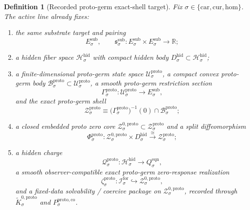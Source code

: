 \documentclass[11pt]{article}
\newcommand{\Car}{\mathrm{car}}
\newcommand{\Cur}{\mathrm{cur}}
\newcommand{\Hom}{\mathrm{hom}}
\newcommand{\ForSpace}[1]{\mathcal I_{#1}^{\mathrm{for}}}
\newcommand{\SubTarget}[1]{E_{#1}^{\mathrm{sub}}}
\newcommand{\SubPair}[1]{\mathfrak s_{#1}^{\mathrm{sub}}}
\newcommand{\EqnTarget}[1]{Q_{#1}^{\mathrm{eqn}}}
\newcommand{\HiddenSpace}[1]{\mathcal H_{#1}^{\mathrm{hid}}}
\newcommand{\HiddenBody}[1]{D_{#1}^{\mathrm{hid}}}
\newcommand{\ProtoSpace}[1]{\mathcal U_{#1}^{\mathrm{proto}}}
\newcommand{\ProtoBody}[1]{\mathcal B_{#1}^{\mathrm{proto}}}
\newcommand{\ProtoSection}[1]{\Gamma_{#1}^{\mathrm{proto}}}
\newcommand{\ProtoShellSet}[1]{\mathcal Z_{#1}^{\mathrm{proto}}}
\newcommand{\ProtoZeroCore}[1]{\mathcal Z_{#1}^{0,\mathrm{proto}}}
\newcommand{\ProtoSplit}[1]{\Phi_{#1}^{\mathrm{proto}}}
\newcommand{\ProtoCharge}[1]{\mathcal Q_{#1}^{\mathrm{proto}}}
\newcommand{\ProtoEmbed}[1]{\zeta_{#1}^{\mathrm{proto}}}
\newcommand{\ProtoKernelCh}[1]{\widetilde K_{#1}^{0,\mathrm{proto}}}
\newcommand{\ProtoStateComp}[1]{P_{#1}^{\mathrm{proto,co}}}
\newtheorem{definition}{Definition}
\begin{document}
\begin{definition}[Recorded proto-germ exact-shell target]
\label{def:proto}
Fix \(\sigma\in\{\Car,\Cur,\Hom\}\). The active line already fixes:
\begin{enumerate}
    \item the same substrate target and pairing
    \[
    \SubTarget{\sigma},
    \qquad
    \SubPair{\sigma}:
    \SubTarget{\sigma}\times\SubTarget{\sigma}\to\mathbb R;
    \]
    \item a hidden fiber space \(\HiddenSpace{\sigma}\) with compact hidden body \(\HiddenBody{\sigma}\subset\HiddenSpace{\sigma}\);
    \item a finite-dimensional proto-germ state space \(\ProtoSpace{\sigma}\), a compact convex proto-germ body \(\ProtoBody{\sigma}\subset\ProtoSpace{\sigma}\), a smooth proto-germ restriction section
    \[
    \ProtoSection{\sigma}:\ProtoSpace{\sigma}\to\SubTarget{\sigma},
    \]
    and the exact proto-germ shell
    \[
    \ProtoShellSet{\sigma}
    \equiv
    \bigl(\ProtoSection{\sigma}\bigr)^{-1}(0)\cap\ProtoBody{\sigma};
    \]
    \item a closed embedded proto zero core \(\ProtoZeroCore{\sigma}\subset\ProtoShellSet{\sigma}\) and a split diffeomorphism
    \[
    \ProtoSplit{\sigma}:
    \ProtoZeroCore{\sigma}\times\HiddenBody{\sigma}
    \xrightarrow{\cong}
    \ProtoShellSet{\sigma};
    \]
    \item a hidden charge
    \[
    \ProtoCharge{\sigma}:\HiddenSpace{\sigma}\to\EqnTarget{\sigma},
    \]
    a smooth observer-compatible exact proto-germ zero-response realization
    \[
    \ProtoEmbed{\sigma}:\ForSpace{\sigma}\hookrightarrow\ProtoZeroCore{\sigma},
    \]
    and a fixed-data solvability / coercive package on \(\ProtoZeroCore{\sigma}\), recorded through \(\ProtoKernelCh{\sigma}\) and \(\ProtoStateComp{\sigma}\).
\end{enumerate}
\end{definition}
\end{document}
